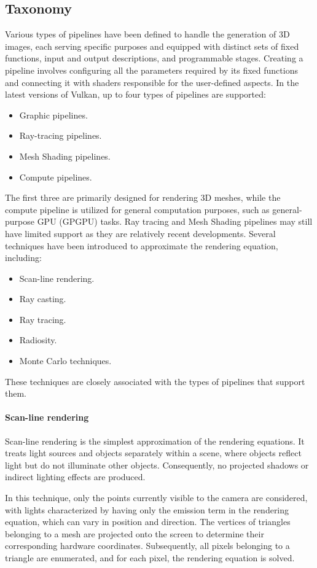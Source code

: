 \subsection{Taxonomy}
Various types of pipelines have been defined to handle the generation of 3D images, each serving specific purposes and equipped with distinct sets of fixed functions, input and output descriptions, and programmable stages. Creating a pipeline involves configuring all the parameters required by its fixed functions and connecting it with shaders responsible for the user-defined aspects.
In the latest versions of Vulkan, up to four types of pipelines are supported:
\begin{itemize}
    \item Graphic pipelines.
    \item Ray-tracing pipelines.
    \item Mesh Shading pipelines.
    \item Compute pipelines.
\end{itemize}
The first three are primarily designed for rendering 3D meshes, while the compute pipeline is utilized for general computation purposes, such as general-purpose GPU (GPGPU) tasks. 
Ray tracing and Mesh Shading pipelines may still have limited support as they are relatively recent developments.
Several techniques have been introduced to approximate the rendering equation, including:
\begin{itemize}
    \item Scan-line rendering.
    \item Ray casting.
    \item Ray tracing.
    \item Radiosity.
    \item Monte Carlo techniques.
\end{itemize}
These techniques are closely associated with the types of pipelines that support them.

\paragraph*{Scan-line rendering}

Scan-line rendering is the simplest approximation of the rendering equations.
It treats light sources and objects separately within a scene, where objects reflect light but do not illuminate other objects. 
Consequently, no projected shadows or indirect lighting effects are produced.

In this technique, only the points currently visible to the camera are considered, with lights characterized by having only the emission term in the rendering equation, which can vary in position and direction. 
The vertices of triangles belonging to a mesh are projected onto the screen to determine their corresponding hardware coordinates. 
Subsequently, all pixels belonging to a triangle are enumerated, and for each pixel, the rendering equation is solved.

